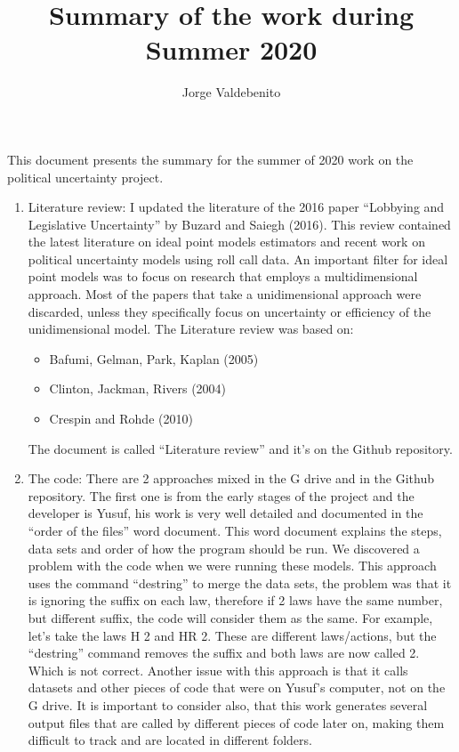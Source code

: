 \documentclass[a4paper,12pt]{article}
\begin{document}
\title{\vspace{-1.5 cm}Summary of the work during Summer 2020}
\author{Jorge Valdebenito}
\maketitle

\noindent This document presents the summary for the summer of 2020 work on the political uncertainty project. 
\begin{enumerate}
\item Literature review:
I updated the literature of the 2016 paper “Lobbying and Legislative Uncertainty” by Buzard and Saiegh (2016). This review contained the latest literature on ideal point models estimators and recent work on political uncertainty models using roll call data. An important filter for ideal point models was to focus on research that employs a multidimensional approach. Most of the papers that take a unidimensional approach were discarded, unless they specifically focus on uncertainty or efficiency of the unidimensional model.
The Literature review was based on:

\begin{itemize}
\item Bafumi, Gelman, Park, Kaplan (2005) 
\item Clinton, Jackman, Rivers (2004)
\item Crespin and Rohde (2010)
\end{itemize}
The document is called “Literature review” and it’s on the Github repository.



\item The code:
There are 2 approaches mixed in the G drive and in the Github repository. The first one is from the early stages of the project and the developer is Yusuf, his work is very well detailed and documented in the “order of the files” word document. This word document explains the steps, data sets and order of how the program should be run. We discovered a problem with the code when we were running these models. This approach uses the command “destring” to merge the data sets, the problem was that it is ignoring the suffix on each law, therefore if 2 laws have the same number, but different suffix, the code will consider them as the same. 
For example, let’s take the laws H 2 and HR 2. These are different laws/actions, but the “destring” command removes the suffix and both laws are now called 2. Which is not correct. 
Another issue with this approach is that it calls datasets and other pieces of code that were on Yusuf’s computer, not on the G drive. It is important to consider also, that this work generates several output files that are called by different pieces of code later on, making them difficult to track and are located in different folders. 


\end{enumerate}
\end{document}

